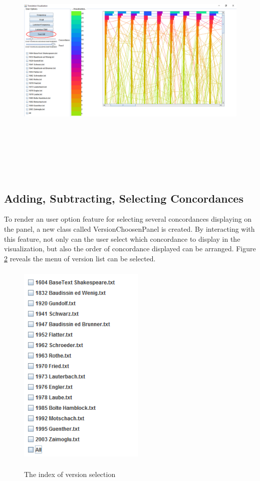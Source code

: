 \begin{figure}[h]
	\centering	
	\includegraphics[width=18cm, height=12cm]{Figs/Text-On-Off}\\[1ex]
	\caption{}
	\label{fig:textOnOff}
\end{figure} 

\subsection{Adding, Subtracting, Selecting Concordances}

To render an user option feature for selecting several concordances displaying on the panel, a new class called VersionChoosenPanel is created. By interacting with this feature, not only can the user select which concordance to display in the visualization, but also the order of concordance displayed can be arranged. Figure
\ref{fig:versionChoosPanel} reveals the menu of version list can be selected. 
\begin{figure}[h]
	\centering	
	\includegraphics[width=6cm, height=10cm]{Figs/VersionChoosePanel}\\[1ex]
	\caption{The index of version selection}
	\label{fig:versionChoosPanel}
\end{figure} 

